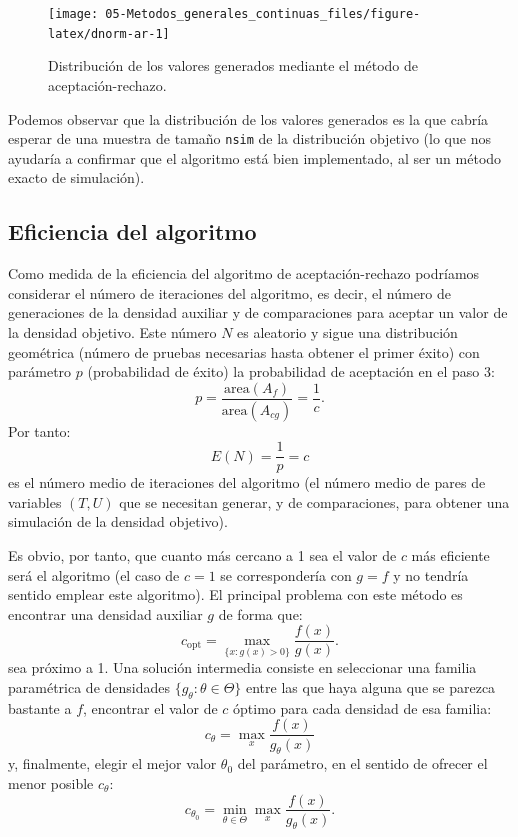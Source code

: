 \documentclass[
]{book}
\theoremstyle{break}
\theoremstyle{definition}
\theoremstyle{definition}
\theoremstyle{definition}
\theoremstyle{definition}
\theoremstyle{remark}
\begin{document}
\begin{enumerate}
  \begin{figure}[!htb]

  {\centering \texttt{[image: 05-Metodos\_generales\_continuas\_files/figure-latex/dnorm-ar-1]} 

  }

  \caption{Distribución de los valores generados mediante el método de aceptación-rechazo.}\label{fig:dnorm-ar}
  \end{figure}

  Podemos observar que la distribución de los valores generados es la que cabría esperar de una muestra de tamaño \texttt{nsim} de la distribución objetivo (lo que nos ayudaría a confirmar que el algoritmo está bien implementado, al ser un método exacto de simulación).
\end{enumerate}

\hypertarget{eficiencia-del-algoritmo}{%
\subsection{Eficiencia del algoritmo}\label{eficiencia-del-algoritmo}}

Como medida de la eficiencia del algoritmo de aceptación-rechazo
podríamos considerar el número de iteraciones del algoritmo,
es decir, el número de generaciones de la densidad auxiliar y
de comparaciones para aceptar un valor de la densidad objetivo.
Este número \(N\) es aleatorio y sigue una distribución geométrica
(número de pruebas necesarias hasta obtener el primer éxito)
con parámetro \(p\) (probabilidad de éxito) la probabilidad de aceptación
en el paso 3:
\[p = \frac{\text{area}\left(
        A_{f}\right) }{\text{area}\left( A_{cg}\right) }=\frac{1}{c}.\]
Por tanto:
\[E\left( N \right) = \frac1p = c\]
es el número medio de iteraciones del algoritmo
(el número medio de pares de variables \(\left( T,U\right)\)
que se necesitan generar, y de comparaciones, para obtener
una simulación de la densidad objetivo).

Es obvio, por tanto, que cuanto más cercano a 1 sea el valor de \(c\) más eficiente será el algoritmo (el caso de \(c=1\) se correspondería con \(g=f\) y no tendría sentido emplear este algoritmo).
El principal problema con este método es encontrar una densidad auxiliar \(g\) de forma que:
\[c_{\text{opt}}=\max_{\{x : g(x) >0\}}
\frac{f(x) }{g(x) }.\]
sea próximo a 1.
Una solución intermedia consiste en seleccionar una familia paramétrica de densidades \(\{g_{\theta} : \theta \in \Theta\}\) entre las que haya alguna que se parezca bastante a \(f\),
encontrar el valor de \(c\) óptimo para cada densidad de esa familia:
\[c_{\theta}=\max_{x}\frac{f\left(  x\right)  }{g_{\theta}(x) }\]
y, finalmente, elegir el mejor valor \(\theta_{0}\) del parámetro, en el sentido de ofrecer el menor posible \(c_{\theta}\):
\[c_{\theta_{0}}=\min_{\theta\in\Theta}\max_{x}\frac{f\left(  x\right) }{g_{\theta}\left(  x\right)  }.\]
\end{document}
